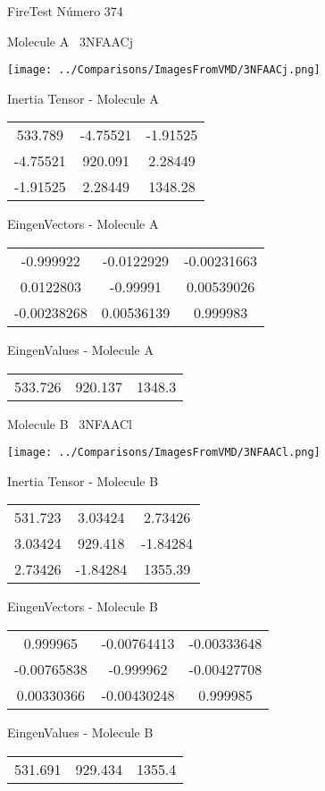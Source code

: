 \vtab[-3cm]
\begin{center}
{\large FireTest \tab Número 374}
\end{center}
\begin{multicols}{2}
\begin{center}

Molecule A \
3NFAACj

\texttt{[image: ../Comparisons/ImagesFromVMD/3NFAACj.png]}

Inertia Tensor - Molecule A \\
\begin{tabular}{|c c c|}
533.789	 & 	-4.75521	 & 	-1.91525	 \\
-4.75521	 & 	920.091	 & 	2.28449	 \\
-1.91525	 & 	2.28449	 & 	1348.28
\end{tabular}

\vtab
 EingenVectors - Molecule A     \\
\begin{tabular}{|c c c|}
-0.999922	 & 	-0.0122929	 & 	-0.00231663	 \\
0.0122803	 & 	-0.99991	 & 	0.00539026	 \\
-0.00238268	 & 	0.00536139	 & 	0.999983
\end{tabular}

\vtab
 EingenValues - Molecule A     \\
\begin{tabular}{|c c c|}
533.726	 & 	920.137	 & 	1348.3	 \\
\end{tabular}
\columnbreak

Molecule B \
3NFAACl

\texttt{[image: ../Comparisons/ImagesFromVMD/3NFAACl.png]}

Inertia Tensor - Molecule B \\
\begin{tabular}{|c c c|}
531.723	 & 	3.03424	 & 	2.73426	 \\
3.03424	 & 	929.418	 & 	-1.84284	 \\
2.73426	 & 	-1.84284	 & 	1355.39
\end{tabular}

\vtab
 EingenVectors - Molecule B     \\
\begin{tabular}{|c c c|}
0.999965	 & 	-0.00764413	 & 	-0.00333648	 \\
-0.00765838	 & 	-0.999962	 & 	-0.00427708	 \\
0.00330366	 & 	-0.00430248	 & 	0.999985
\end{tabular}

\vtab
 EingenValues - Molecule B     \\
\begin{tabular}{|c c c|}
531.691	 & 	929.434	 & 	1355.4	 \\
\end{tabular}

\end{center}
\end{multicols}

